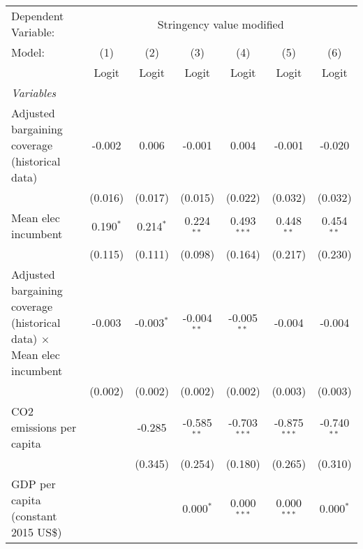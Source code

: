 
\begingroup
\centering
\begin{tabular}{lcccccc}
   \toprule
   Dependent Variable: & \multicolumn{6}{c}{Stringency value modified}\\
   Model:                                                                       & (1)         & (2)          & (3)           & (4)            & (5)            & (6)\\  
                                                                                &  Logit      & Logit        & Logit         & Logit          & Logit          & Logit\\  
   \midrule
   \emph{Variables}\\
   Adjusted bargaining coverage (historical data)                               & -0.002      & 0.006        & -0.001        & 0.004          & -0.001         & -0.020\\   
                                                                                & (0.016)     & (0.017)      & (0.015)       & (0.022)        & (0.032)        & (0.032)\\   
   Mean elec incumbent                                                          & 0.190$^{*}$ & 0.214$^{*}$  & 0.224$^{**}$  & 0.493$^{***}$  & 0.448$^{**}$   & 0.454$^{**}$\\   
                                                                                & (0.115)     & (0.111)      & (0.098)       & (0.164)        & (0.217)        & (0.230)\\   
   Adjusted bargaining coverage (historical data) $\times$ Mean elec incumbent  & -0.003      & -0.003$^{*}$ & -0.004$^{**}$ & -0.005$^{**}$  & -0.004         & -0.004\\   
                                                                                & (0.002)     & (0.002)      & (0.002)       & (0.002)        & (0.003)        & (0.003)\\   
   CO2 emissions per capita                                                     &             & -0.285       & -0.585$^{**}$ & -0.703$^{***}$ & -0.875$^{***}$ & -0.740$^{**}$\\   
                                                                                &             & (0.345)      & (0.254)       & (0.180)        & (0.265)        & (0.310)\\   
   GDP per capita (constant 2015 US\$)                                          &             &              & 0.000$^{*}$   & 0.000$^{***}$  & 0.000$^{***}$  & 0.000$^{*}$\\   

\end{tabular}
